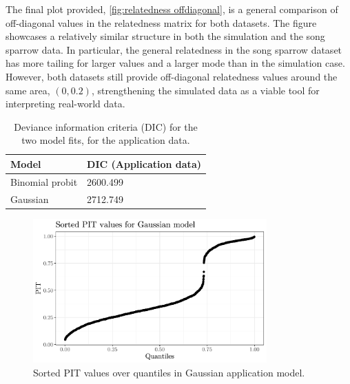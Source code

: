 The final plot provided, \autoref{fig:relatedness offdiagonal}, is a general comparison of off-diagonal values in the relatedness matrix for both datasets. The figure showcases a relatively similar structure in both the simulation and the song sparrow data. In particular, the general relatedness in the song sparrow dataset has more tailing for larger values and a larger mode than in the simulation case. However, both datasets still provide off-diagonal relatedness values around the same area, $(0,0.2)$, strengthening the simulated data as a viable tool for interpreting real-world data.

\begin{table}
    \centering
    \begin{tabular}{@{}ll@{}}
    \toprule
        Model           & DIC (Application data) \\ \midrule
        Binomial probit & 2600.499  \\
        Gaussian        & 2712.749 \\
        \bottomrule
    \end{tabular}
    \caption[DIC for application data]{Deviance information criteria (DIC) for the two model fits, for the application data. }
    \label{tab:application DICs}
\end{table}

\begin{figure}
    \centering
    \includegraphics[width=0.8\textwidth]{figures/PIT-sorted.pdf}
    \caption{Sorted PIT values over quantiles in Gaussian application model.}
    \label{fig:sorted pit values}
\end{figure}

